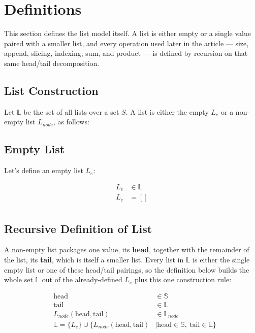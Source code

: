 \section{Definitions}
\label{sec:definitions}

This section defines the list model itself. A list is either empty or a
single value paired with a smaller list, and every operation used later in
the article --- size, append, slicing, indexing, sum, and product --- is
defined by recursion on that same head/tail decomposition.

\subsection{List Construction}

Let $\mathbb{L}$ be the set of all lists over a set $S$. A list is either
the empty $L_{e}$ or a non-empty list $L_{node}$, as follows:

\subsection{Empty List}

Let's define an empty list $L_{e}$:

\begin{equation*}
\begin{aligned}
L_{e} & \in \mathbb{L} \\
L_{e} & = [] \\
\end{aligned}
\end{equation*}

\subsection{Recursive Definition of List}

A non-empty list packages one value, its \textbf{head}, together with the
remainder of the list, its \textbf{tail}, which is itself a smaller list.
Every list in $\mathbb{L}$ is either the single empty list or one of these
head/tail pairings, so the definition below builds the whole set
$\mathbb{L}$ out of the already-defined $L_e$ plus this one construction
rule:

\begin{equation*}
\begin{aligned}
&\text{head} & \in \mathbb{S} \\
&\text{tail} & \in \mathbb{L} \\
&L_{node}(\text{head}, \text{tail}) & \in \mathbb{L}_{node} \\
&\mathbb{L} = \{ L_e \} \cup \{ L_{node}(\text{head}, \text{tail}) & \mid \text{head} \in \mathbb{S},\ \text{tail} \in \mathbb{L} \} \\
\end{aligned}
\end{equation*}

